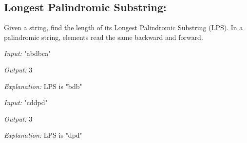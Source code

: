 \newpage

\subsection{Longest Palindromic Substring:}



Given a string, find the length of its Longest Palindromic Substring (LPS). 
In a palindromic string, elements read the same backward and forward.



    \textit{Input:} "abdbca"
    
    \textit{Output:} 3
    
    \textit{Explanation:} LPS is "bdb"
    \newline

    \textit{Input:} "cddpd"
    
    \textit{Output:} 3
    
    \textit{Explanation:} LPS is "dpd"



